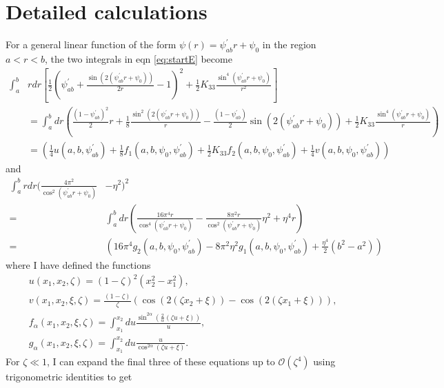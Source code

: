 \documentclass[12pt]{article}
\begin{document}
\section{Detailed calculations}
For a general linear function of the form $\psi(r)=\psi_{ab}^{\prime}r+\psi_0$ in the region $a<r<b$, the two integrals in eqn \ref{eq:startE} become
\begin{align}\label{eq:first_int}
\int_{a}^{b}&rdr\left[\frac{1}{2}\left(\psi_{ab}^{\prime}+\frac{\sin(2(\psi_{ab}^{\prime}r+\psi_0))}{2r}-1\right)^2+\frac{1}{2}K_{33}\frac{\sin^4(\psi_{ab}^{\prime}r+\psi_0)}{r^2}\right]\nonumber\\
&=\int_{a}^{b}dr\left(\frac{(1-\psi_{ab}^{\prime})^2}{2}r+\frac{1}{8}\frac{\sin^2(2(\psi_{ab}^{\prime}r+\psi_0))}{r}-\frac{(1-\psi_{ab}^{\prime})}{2}\sin(2(\psi_{ab}^{\prime}r+\psi_0))+\frac{1}{2}K_{33}\frac{\sin^4(\psi_{ab}^{\prime}r+\psi_0)}{r}\right)\nonumber\\
&=\left(\frac{1}{4}u(a,b,\psi_{ab}^{\prime})+\frac{1}{8}f_1(a,b,\psi_0,\psi_{ab}^{\prime})+\frac{1}{2}K_{33}f_2(a,b,\psi_0,\psi_{ab}^{\prime})+\frac{1}{4}v(a,b,\psi_0,\psi_{ab}^{\prime})\right)
\end{align}
and
\begin{align}\label{eq:second_int}
\int_{a}^{b}rdr\bigg(\frac{4\pi^2}{\cos^2(\psi_{ab}^{\prime}r+\psi_0)}&-\eta^2\bigg)^2\nonumber\\
=&\int_{a}^{b}dr\left(\frac{16\pi^4r}{\cos^4(\psi_{ab}^{\prime}r+\psi_0)}-\frac{8\pi^2r}{\cos^2(\psi_{ab}^{\prime}r+\psi_0)}\eta^2+\eta^4r\right)\nonumber\\
=&\left(16\pi^4g_2(a,b,\psi_0,\psi_{ab}^{\prime})-8\pi^2\eta^2g_1(a,b,\psi_0,\psi_{ab}^{\prime})+\frac{\eta^4}{2}(b^2-a^2)\right)
\end{align}
where I have defined the functions
\begin{subequations}
\begin{align}
&u(x_1,x_2,\zeta)=(1-\zeta)^2(x_2^2-x_1^2),\label{eq:ufunc}\\
&v(x_1,x_2,\xi,\zeta)=\frac{(1-\zeta)}{\zeta}(\cos(2(\zeta x_2+\xi))-\cos(2(\zeta x_1+\xi))),\label{eq:vfunc}\\
&f_{\alpha}(x_1,x_2,\xi,\zeta)=\int_{x_1}^{x_2}du\frac{\sin^{2\alpha}\left(\frac{2}{\alpha}(\zeta u+\xi)\right)}{u},\label{eq:falpha}\\
&g_{\alpha}(x_1,x_2,\xi,\zeta)=\int_{x_1}^{x_2}du\frac{u}{\cos^{2\alpha}(\zeta u+\xi)}.\label{eq:galpha}
\end{align}
\end{subequations}
For $\zeta\ll1$, I can expand the final three of these equations up to $\mathcal{O}(\zeta^4)$ using trigonometric identities to get
\end{document}
